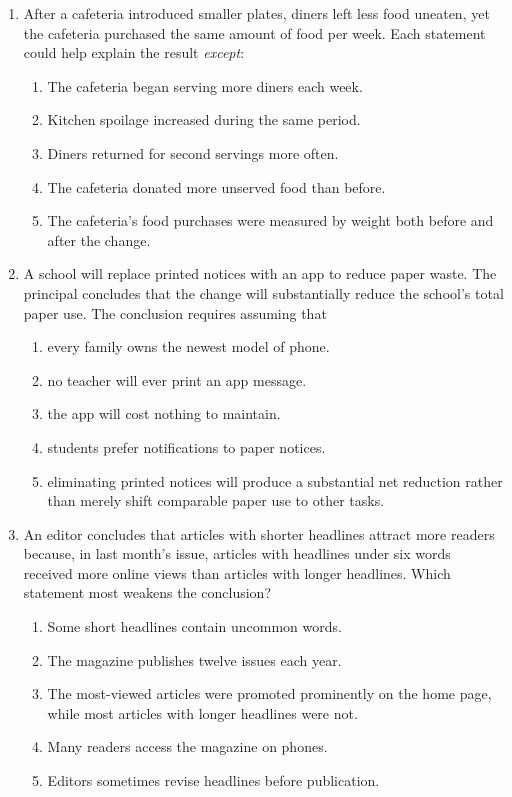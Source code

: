 \begin{enumerate}
\item After a cafeteria introduced smaller plates, diners left less food uneaten,
yet the cafeteria purchased the same amount of food per week. Each statement
could help explain the result \emph{except}:
  \begin{enumerate}
  \item The cafeteria began serving more diners each week.
  \item Kitchen spoilage increased during the same period.
  \item Diners returned for second servings more often.
  \item The cafeteria donated more unserved food than before.
  \item The cafeteria's food purchases were measured by weight both before and
        after the change.
  \end{enumerate}

\item A school will replace printed notices with an app to reduce paper waste.
The principal concludes that the change will substantially reduce the school's
total paper use. The conclusion requires assuming that
  \begin{enumerate}
  \item every family owns the newest model of phone.
  \item no teacher will ever print an app message.
  \item the app will cost nothing to maintain.
  \item students prefer notifications to paper notices.
  \item eliminating printed notices will produce a substantial net reduction
        rather than merely shift comparable paper use to other tasks.
  \end{enumerate}

\item An editor concludes that articles with shorter headlines attract more
readers because, in last month's issue, articles with headlines under six words
received more online views than articles with longer headlines. Which statement
most weakens the conclusion?
  \begin{enumerate}
  \item Some short headlines contain uncommon words.
  \item The magazine publishes twelve issues each year.
  \item The most-viewed articles were promoted prominently on the home page,
        while most articles with longer headlines were not.
  \item Many readers access the magazine on phones.
  \item Editors sometimes revise headlines before publication.
  \end{enumerate}


\end{enumerate}
